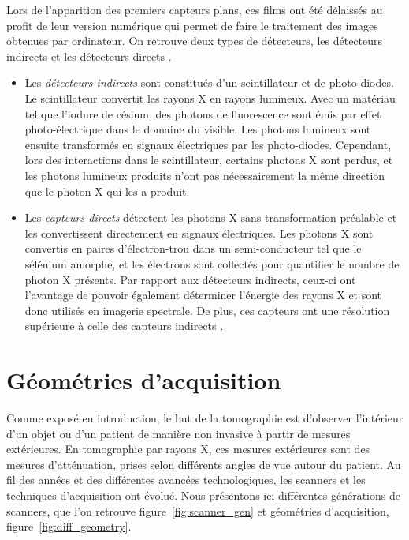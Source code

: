 Lors de l'apparition des premiers capteurs plans, ces films ont été délaissés au profit de leur version numérique qui permet de faire le traitement des images obtenues par ordinateur. On retrouve deux types de détecteurs, les détecteurs indirects et les détecteurs directs . 
\begin{itemize}
	\item[] Les {\it détecteurs indirects} sont constitués d'un scintillateur et de photo-diodes. Le scintillateur convertit les rayons X en rayons lumineux. Avec un matériau tel que l'iodure de césium, des photons de fluorescence sont émis par effet photo-électrique dans le domaine du visible. Les photons lumineux sont ensuite transformés en signaux électriques par les photo-diodes. Cependant, lors des interactions dans le scintillateur, certains photons X sont perdus, et les photons lumineux produits n'ont pas nécessairement la même direction que le photon X qui les a produit.
	\item[] Les {\it capteurs directs} détectent les photons X sans transformation préalable et les convertissent directement en signaux électriques. Les photons X sont convertis en paires d'électron-trou dans un semi-conducteur tel que le sélénium amorphe, et les électrons sont collectés pour quantifier le nombre de photon X présents. Par rapport aux détecteurs indirects, ceux-ci ont l'avantage de pouvoir également déterminer l'énergie des rayons X et sont donc utilisés en imagerie spectrale.  De plus, ces capteurs ont une résolution supérieure à celle des capteurs indirects .
\end{itemize}


\section{Géométries d'acquisition}

Comme exposé en introduction, le but de la tomographie est d'observer l'intérieur d'un objet ou d'un patient de manière non invasive à partir de mesures extérieures. En tomographie par rayons X, ces mesures extérieures sont des mesures d'atténuation, prises selon différents angles de vue autour du patient. Au fil des années et des différentes avancées technologiques, les scanners et les techniques d'acquisition ont évolué. Nous présentons ici différentes générations de scanners, que l'on retrouve figure~\ref{fig:scanner_gen} et géométries d'acquisition, figure~\ref{fig:diff_geometry}.

